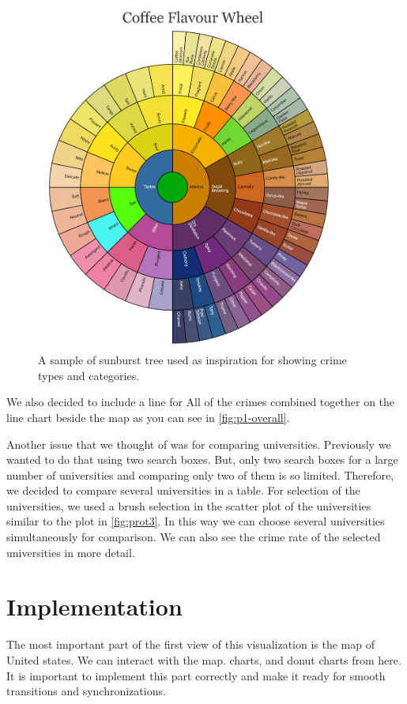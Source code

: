 \documentclass[12pt]{article}
\begin{document}
\begin{figure}[tbph]
   \centering{}
	       \includegraphics[width=4in]{sunburst-ex}           
\caption{A sample of sunburst tree used as inspiration for showing crime types and categories.}
\label{fig:SBchartEx}
\end{figure}

We also decided to include a line for All of the crimes combined together on the line chart beside the map as you can see in \cref{fig:p1-overall}.

Another issue that we thought of was for comparing universities. Previously we wanted to do that using two search boxes. But, only two search boxes for a large number of universities and comparing only two of them is so limited. Therefore, we decided to compare several universities in a table. For selection of the universities, we used a brush selection in the scatter plot of the universities similar to the plot in \cref{fig:prot3}. In this way we can choose several universities simultaneously for comparison. We can also see the crime rate of the selected universities in more detail.


\section{Implementation}
The most important part of the first view of this visualization is the map of United states. We can interact with the map. charts, and donut charts from here. It is important to implement this part correctly and make it ready for smooth transitions and synchronizations.
\end{document}
